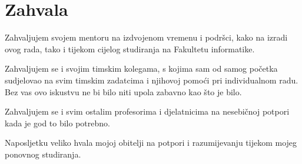 \chapter*{Zahvala}
Zahvaljujem svojem mentoru  na izdvojenom vremenu i podršci, kako na izradi ovog rada, tako i tijekom cijelog studiranja na Fakultetu informatike.

Zahvaljujem se i svojim timskim kolegama,  s kojima sam od samog početka sudjelovao na svim timskim zadatcima i njihovoj pomoći pri individualnom radu. Bez vas ovo iskustvu ne bi bilo niti upola zabavno kao što je bilo.

Zahvaljujem se i svim ostalim profesorima i djelatnicima  na nesebičnoj potpori kada je god to bilo potrebno.

Naposljetku veliko hvala mojoj obitelji na potpori i razumijevanju tijekom mojeg ponovnog studiranja.
